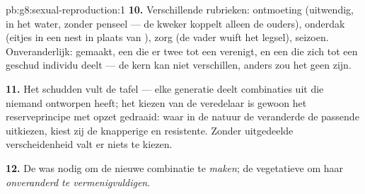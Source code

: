 \begin{solution}{pb:g8:sexual-reproduction:1}
\textbf{10.} Verschillende rubrieken: ontmoeting (uitwendig, in het water,
zonder penseel --- de kweker koppelt alleen de ouders), onderdak (eitjes
in een nest in plaats van ), zorg (de vader wuift het legsel),
seizoen. Onveranderlijk:  gemaakt, een  die er twee tot
een  verenigt, en een  die zich tot een geschud individu
deelt --- de kern kan niet verschillen, anders zou het geen  zijn.

\textbf{11.} Het schudden vult de tafel --- elke generatie deelt
combinaties uit die niemand ontworpen heeft; het kiezen van de veredelaar
is gewoon het reserveprincipe met opzet gedraaid: waar in de natuur de
veranderde  de passende uitkiezen, kiest zij de knapperige
en resistente. Zonder uitgedeelde verscheidenheid valt er niets te kiezen.

\textbf{12.} De  was nodig om de nieuwe
combinatie te \emph{maken}; de vegetatieve om haar \emph{onveranderd te
vermenigvuldigen}.
\end{solution}
